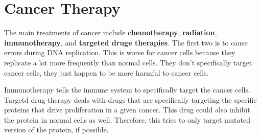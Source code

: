 \documentclass{article}
\begin{document}
\section{ Cancer Therapy }

The main treatments of cancer include \textbf{chemotherapy}, \textbf{radiation},
\textbf{immunotherapy}, and \textbf{targeted druge therapies}. The first two is
to cause errors during DNA replication. This is worse for cancer cells because
they replicate a lot more frequently than normal cells. They don't specifically
target cancer cells, they just happen to be more harmful to cancer cells. 

Immunotherapy tells the immune system to specifically target the cancer cells.
Targetd drug therapy deals with drugs that are specifically targeting the
specific proteins that drive proliferation in a given cancer. This drug could
also inhibit the protein in normal cells as well. Therefore, this tries to only
target mutated version of the protein, if possible.
\end{document}
